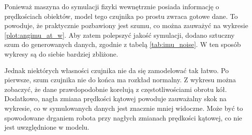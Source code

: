 		Ponieważ maszyna do symulacji fizyki wewnętrznie posiada informację o prędkościach obiektów, model tego czujnika po prostu zwraca gotowe dane. 
		To powoduje, że praktycznie pozbawiony jest szumu, co można zauważyć na wykresie \ref{plot:angimu_at_w}.
		Aby zatem polepszyć jakość symulacji, dodano sztuczny szum do generowanych danych, zgodnie z tabelą \ref{tab:imu_noise}.
		W ten sposób wykresy są do siebie bardziej zbliżone.
		
		Jednak niektórych własności czujnika nie da się zamodelować tak łatwo. Po pierwsze, szum czujnika nie do końca ma rozkład normalny.
		Z wykresu można zobaczyć, że dane prawdopodobnie korelują z częstotliwościami obrotu kół.
		Dodatkowo, nagła zmiana prędkości kątowej powoduje zauważalny skok na wykresie, co w symulowanych danych jest znacznie mniej widoczne.
		Może być to spowodowane drganiem robota przy nagłych zmianach prędkości kątowej, co nie jest uwzględnione w modelu.
		
		
		
	
	

